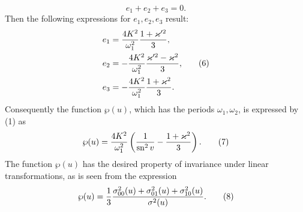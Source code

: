 \documentclass[11pt]{article}
\providecommand{\sn}{\operatorname{sn}}
\begin{document}
\begin{equation}
 e_1+e_2+e_3=0.
\tag{5}
\end{equation}
Then the following expressions for $e_1,e_2,e_3$ result:
\begin{equation}
\begin{aligned}
e_1&={4K^2\over\omega_1^2}{1+\varkappa'^2\over3},\\
e_2&=-{4K^2\over\omega_1^2}{\varkappa'^2-\varkappa^2\over3},\\
e_3&=-{4K^2\over\omega_1^2}{1+\varkappa^2\over3}.
\end{aligned}
\tag{6}
\end{equation}
Consequently the function $\wp(u)$, which has the periods $\omega_1,\omega_2$, is expressed by (1) as
\begin{equation}
\wp(u)={4K^2\over\omega_1^2}\left({1\over\sn^2v}-{1+\varkappa^2\over3}\right).
\tag{7}
\end{equation}
The function $\wp(u)$ has the desired property of invariance under linear transformations, as is seen from the expression
\begin{equation}
\wp(u)={1\over3}{\sigma_{00}^2(u)+\sigma_{01}^2(u)+\sigma_{10}^2(u)\over\sigma^2(u)}.
\tag{8}
\end{equation}
\end{document}
